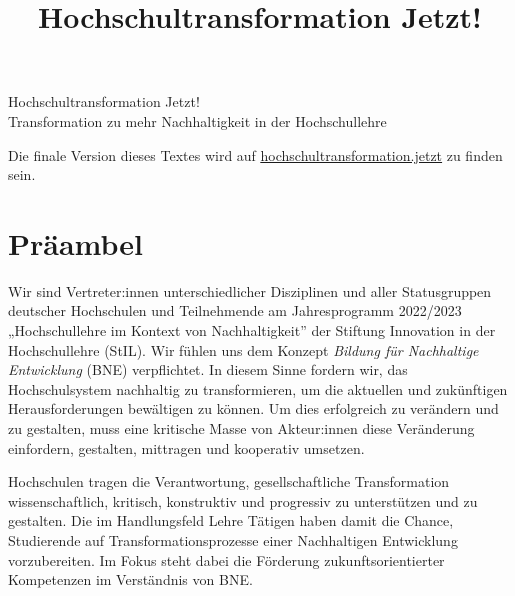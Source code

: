 \documentclass[DIV=12]{scrartcl}
\begin{document}
\newcommand*{\Autor}{}
\newcommand*{\Titel}{Hochschultransformation Jetzt!}
\newcommand*{\Untertitel}{Transformation zu mehr Nachhaltigkeit in der Hochschullehre}
\title{\Titel}

\begin{center}
	\vspace{0,1cm}
	\LARGE{\Titel}\\
	\large{\Untertitel}\\
\end{center}





\begin{framed}
Die finale Version dieses Textes wird auf \href{https://hochschultransformation.jetzt/unterzeichnende.html}{\underline{hochschultransformation.jetzt}} zu finden sein.
\end{framed}


\hypertarget{pruxe4ambel}{%
\section*{Präambel}\label{pruxe4ambel}}

Wir sind Vertreter:innen unterschiedlicher Disziplinen und aller
Statusgruppen deutscher Hochschulen und Teilnehmende am Jahresprogramm
2022/2023 „Hochschullehre im Kontext von Nachhaltigkeit'' der Stiftung
Innovation in der Hochschullehre (StIL). Wir fühlen uns dem Konzept
\emph{Bildung für Nachhaltige Entwicklung} (BNE) verpflichtet. In diesem
Sinne fordern wir, das Hochschulsystem nachhaltig zu transformieren, um
die aktuellen und zukünftigen Herausforderungen bewältigen zu können. Um
dies erfolgreich zu verändern und zu gestalten, muss eine kritische
Masse von Akteur:innen diese Veränderung einfordern, gestalten,
mittragen und kooperativ umsetzen.

Hochschulen tragen die Verantwortung, gesellschaftliche Transformation
wissenschaftlich, kritisch, konstruktiv und progressiv zu unterstützen
und zu gestalten. Die im Handlungsfeld Lehre Tätigen haben damit die
Chance, Studierende auf Transformationsprozesse einer Nachhaltigen
Entwicklung vorzubereiten. Im Fokus steht dabei die Förderung
zukunftsorientierter Kompetenzen im Verständnis von BNE.
\end{document}
